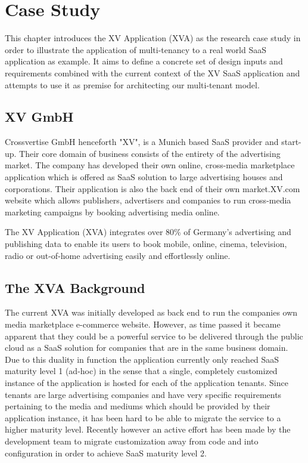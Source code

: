 \chapter{Case Study}

This chapter introduces the XV Application (XVA) as the research case study in order to illustrate the application of multi-tenancy to a real world SaaS application as example. It aims to define a concrete set of design inputs and requirements combined with the current context of the XV SaaS application and attempts to use it as premise for architecting our multi-tenant model.


\section{XV GmbH}

Crossvertise GmbH henceforth "XV", is a Munich based SaaS provider and start-up. Their core domain of business consists of the entirety of the advertising market. The company has developed their own online, cross-media marketplace application which is offered as SaaS solution to large advertising houses and corporations. Their application is also the back end of their own market.XV.com website which allows publishers, advertisers and companies to run cross-media marketing campaigns by booking advertising media online.
 
The XV Application (XVA) integrates over 80\% of Germany's advertising and publishing data to enable its users to book mobile, online, cinema, television, radio or out-of-home advertising easily and effortlessly online.


\section{The XVA Background}

The current XVA was initially developed as back end to run the companies own media marketplace e-commerce website. However, as time passed it became apparent that they could be a powerful service to be delivered through the public cloud as a SaaS solution for companies that are in the same business domain. Due to this duality in function the application currently only reached SaaS maturity level 1 (ad-hoc) \cite{Chong2006} in the sense that a single, completely customized instance of the application is hosted for each of the application tenants. Since tenants are large advertising companies and have very specific requirements pertaining to the media and mediums which should be provided by their application instance, it has been hard to be able to migrate the service to a higher maturity level. Recently however an active effort has been made by the development team to migrate customization away from code and into configuration in order to achieve SaaS maturity level 2.
 

